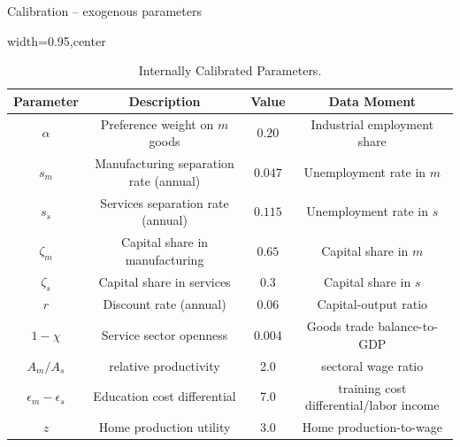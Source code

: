 \documentclass[9pt,xcolor={svgnames}]{beamer}
\begin{document}
\begin{frame}{Calibration -- exogenous parameters}
\begin{table}[h!]
\centering
\caption{Internally Calibrated Parameters.}\label{table_calibrated_parameters}
\begin{adjustbox}{width=0.95\columnwidth,center}
\begin{tabular}{||c c c c||}\hline
\textbf{Parameter} & \textbf{Description} & \textbf{Value} & Data Moment \\\hline\hline
$\alpha$ & Preference weight on $m$ goods & $0.20$ & Industrial employment share \\
$s_m$ & Manufacturing separation rate (annual) & $0.047$ & Unemployment rate in $m$  \\
$s_s$ & Services separation rate (annual) & $0.115$ & Unemployment rate in $s$ \\
$\zeta_m$ & Capital share in manufacturing & $0.65$ & Capital share in $m$\\
$\zeta_s$ & Capital share in services & $0.3$ &  Capital share in $s$ \\
$r$ & Discount rate (annual) & $0.06$ & Capital-output ratio \\
$1-\chi$ & Service sector openness & 0.004 & Goods trade balance-to-GDP \\
$A_m/A_s$   & relative productivity & 2.0  &   sectoral wage ratio\\
$\epsilon_m-\epsilon_s$ & Education cost differential & 7.0 &  training cost differential/labor income \\ 
$z$  & Home production utility  & 3.0 & Home production-to-wage
\\\hline
\end{tabular}
\end{adjustbox}
\end{table}



\end{frame}
\end{document}
